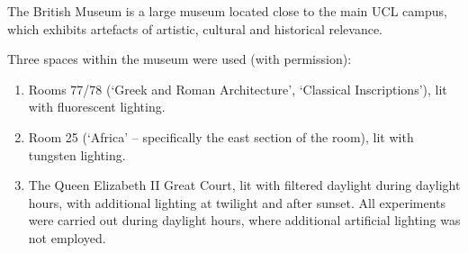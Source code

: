 The British Museum is a large museum located close to the main UCL campus, which exhibits artefacts of artistic, cultural and historical relevance. 

Three spaces within the museum were used (with permission):

\begin{enumerate}
    \item Rooms 77/78 (‘Greek and Roman Architecture’, ‘Classical Inscriptions’), lit with fluorescent lighting.
    \item Room 25 (‘Africa’ – specifically the east section of the room), lit with tungsten  lighting.
    \item The Queen Elizabeth II Great Court, lit with filtered daylight \cite{foster_and_partners_london._great_2002} during daylight hours, with additional lighting at twilight and after sunset. All experiments were carried out during daylight hours, where additional artificial lighting was not employed.
\end{enumerate}
























